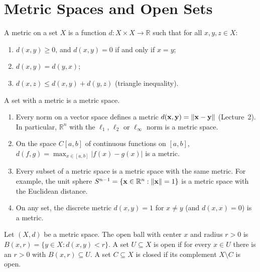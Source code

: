 \section{Metric Spaces and Open Sets}\label{A-sec:metric}

\begin{definition}\label{A-def:metric}
    A metric on a set $X$ is a function $d: X \times X \to \mathbb{R}$ such that for all $x, y, z \in X$:
    \begin{enumerate}
        \item $d(x, y) \geq 0$, and $d(x, y) = 0$ if and only if $x = y$;
        \item $d(x, y) = d(y, x)$;
        \item $d(x, z) \leq d(x, y) + d(y, z)$ (triangle inequality).
    \end{enumerate}
    A set with a metric is a metric space.
\end{definition}

\begin{example}\label{A-ex:metrics}
    \begin{enumerate}
        \item Every norm on a vector space defines a metric $d(\mathbf{x}, \mathbf{y}) = \lVert \mathbf{x} - \mathbf{y} \rVert$ (Lecture~2). In particular, $\mathbb{R}^n$ with the $\ell_1$, $\ell_2$ or $\ell_\infty$ norm is a metric space.
        \item On the space $C[a, b]$ of continuous functions on $[a, b]$, $d(f, g) = \max_{x \in [a, b]}|f(x) - g(x)|$ is a metric.
        \item Every subset of a metric space is a metric space with the same metric. For example, the unit sphere $S^{n-1} = \{\mathbf{x} \in \mathbb{R}^n : \lVert \mathbf{x} \rVert = 1\}$ is a metric space with the Euclidean distance.
        \item On any set, the discrete metric $d(x, y) = 1$ for $x \neq y$ (and $d(x, x) = 0$) is a metric.
    \end{enumerate}
\end{example}

\begin{definition}\label{A-def:open-closed}
    Let $(X, d)$ be a metric space. The open ball with center $x$ and radius $r > 0$ is $B(x, r) = \{y \in X : d(x, y) < r\}$. A set $U \subseteq X$ is open if for every $x \in U$ there is an $r > 0$ with $B(x, r) \subseteq U$. A set $C \subseteq X$ is closed if its complement $X \setminus C$ is open.
\end{definition}

